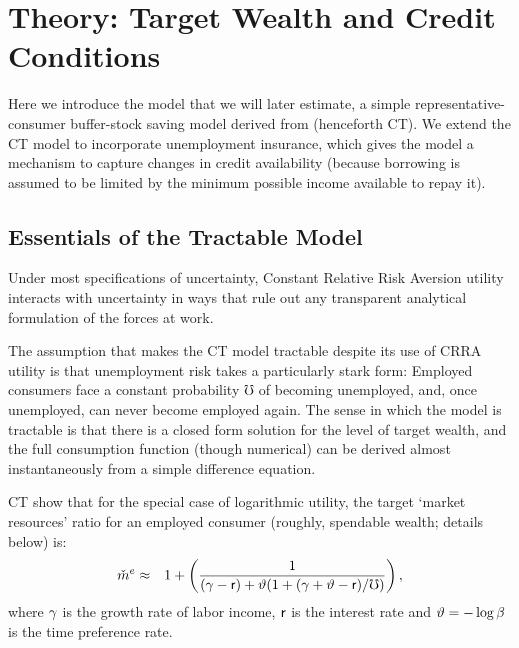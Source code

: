 \documentclass[titlepage]{\econtex}
\begin{document}
\hypertarget{ssTractableBS}{}

\section{Theory: Target Wealth and Credit Conditions} \label{ssTractableBS}

Here we introduce the model that we will later estimate, a simple representative-consumer buffer-stock saving model derived from \cite{ctDiscrete} (henceforth CT).  We extend the CT model to incorporate unemployment insurance, which gives the model a mechanism to capture changes in credit availability (because borrowing is assumed to be limited by the minimum possible income available to repay it).

\subsection{Essentials of the Tractable Model}

Under most specifications of uncertainty, Constant Relative Risk Aversion utility interacts with uncertainty in ways that rule out any transparent analytical formulation of the forces at work.

The assumption that makes the CT model tractable despite its use of CRRA utility is that unemployment risk takes a particularly stark form: Employed consumers face a constant probability $\mho$ of becoming unemployed, and, once unemployed, can never become employed again.  The sense in which the model is tractable is that there is a closed form solution for the level of target wealth, and the full consumption function (though numerical) can be derived almost instantaneously from a simple difference equation.  %

CT show that for the special case of logarithmic utility, the target `market resources' ratio for an employed consumer (roughly, spendable wealth; details below) is:
\begin{eqnarray}
  \check{m}^{e}
  & \approx &
  1 + \left(\frac{1}{(\gamma-\mathsf{r})+\vartheta(1+(\gamma+\vartheta-\mathsf{r})/\mho)}\right),
\label{eq:mTargetLogCase}
\end{eqnarray}
where $\gamma$ is the growth rate of labor income, $\mathsf{r}$ is the interest rate and $\vartheta=-\log \beta$ is the time preference rate.
\end{document}
